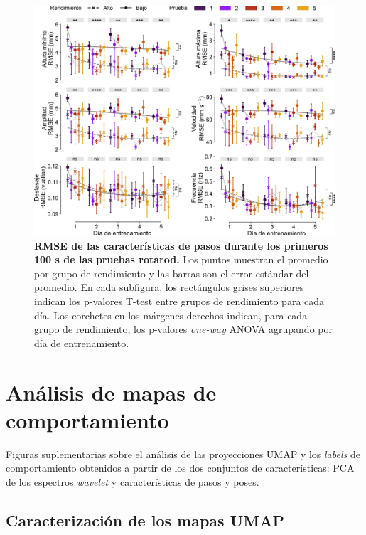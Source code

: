 \begin{appendix}
    \begin{figure}[htbp]
        \centering
        \includegraphics[width=0.99\linewidth]{figuras/capitulo3/metricas_rmse.pdf}
        \caption{\textbf{RMSE de las características de pasos durante los primeros 100 s de las pruebas rotarod.} Los puntos muestran el promedio por grupo de rendimiento y las barras son el error estándar del promedio.
            En cada subfigura, los rectángulos grises superiores indican los p-valores T-test entre grupos de rendimiento para cada día.
            Los corchetes en los márgenes derechos indican, para cada grupo de rendimiento, los p-valores \textit{one-way} ANOVA agrupando por día de entrenamiento.}
        \label{fig:capitulo3_metricas_rmse}
    \end{figure}

    \clearpage

    \chapter{Análisis de mapas de comportamiento}\label{cha:apendice_mapas}

    Figuras suplementarias sobre el análisis de las proyecciones UMAP y los \textit{labels} de comportamiento obtenidos a partir de los dos conjuntos de características: PCA de los espectros \textit{wavelet} y características de pasos y poses.

    \section{Caracterización de los mapas UMAP}\label{sec:apendice_umap}


\end{appendix}
